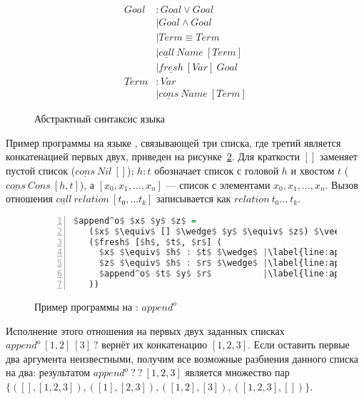 \begin{figure}[h!]
    \begin{center}
    \begin{minipage}{0.5\textwidth}
    \begin{align*}
      Goal &: Goal \vee Goal \ \ \ \ \ \ \ \ \ \ \\
           &\mid Goal \wedge Goal \ \ \ \ \ \ \ \ \ \  \\
           &\mid Term \equiv Term \ \ \ \ \ \ \  \\
           &\mid \underline{call} \ Name \ [Term] \ \ \\
           &\mid \underline{fresh} \ [Var] \ Goal \ \ \\
      Term &: Var \\
           &\mid \underline{cons} \ Name \ [Term]
    \end{align*}
    \end{minipage}
    \end{center}
  \caption{Абстрактный синтаксис языка \miniKanren{}}
  \label{lst:miniKanren}
\end{figure}

Пример программы на языке \miniKanren{}, связывающей три списка, где третий является конкатенацией первых двух, приведен на рисунке~\ref{lst:appendo}.
Для краткости $[]$ заменяет пустой список ($\underline{cons} \ Nil \ []$); $h : t$ обозначает список с головой $h$ и хвостом $t$ ($\underline{cons} \ Cons \ [h, t]$), а $[x_0, x_1, \dots, x_n]$ --- список с элементами $x_0, x_1, \dots, x_n$.
Вызов отношения $\underline{call} \ relation \ [t_0, \dots t_k]$ записывается как $relation \ t_0 \dots \ t_k$.

\begin{figure}[h!]
  \begin{center}
  \begin{minipage}{0.45\textwidth}
    \begin{lstlisting}[language=Haskell, frame=single, numbers=left,numberstyle=\small, escapechar=|]
 $append^o$ $x$ $y$ $z$ =
   ($x$ $\equiv$ [] $\wedge$ $y$ $\equiv$ $z$) $\vee$ |\label{line:appendo2}|
   ($fresh$ [$h$, $t$, $r$] (
     $x$ $\equiv$ $h$ : $t$ $\wedge$ |\label{line:appendo4}|
     $z$ $\equiv$ $h$ : $r$ $\wedge$ |\label{line:appendo5}|
     $append^o$ $t$ $y$ $r$          |\label{line:appendo6}|
   ))
    \end{lstlisting}
  \end{minipage}
  \end{center}
  \caption{Пример программы на \miniKanren{}: $append^o$}
  \label{lst:appendo}
\end{figure}

Исполнение этого отношения на первых двух заданных списках \\ $append^o \ [1,2] \ [3] \ ?$ вернёт их конкатенацию $[1,2,3]$.
Если оставить первые два аргумента неизвестными, получим все возможные разбиения данного списка на два: результатом $append^o \ ? \ ? \ [1,2,3]$ является множество пар $\{([],[1,2,3]), ([1], [2,3]), ([1,2], [3]), ([1,2,3], [])\}$.
